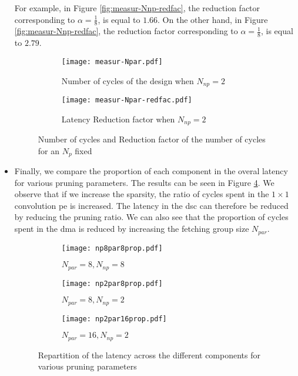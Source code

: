 \begin{itemize}
    For example, in Figure \ref{fig:measur-Nnp-redfac}, the reduction factor corresponding to $\alpha = \frac{1}{8}$, is equal to $1.66$. On the other hand,
    in Figure \ref{fig:measur-Nnp-redfac}, the reduction factor corresponding to $\alpha = \frac{1}{8}$, is equal to $2.79$.
    \begin{figure}[H]
        \centering
        \begin{subfigure}[t]{.49\textwidth}
            \centering
            \texttt{[image: measur-Npar.pdf]}
            \caption{Number of cycles of the design when $N_{np} = 2$}
            \label{fig:measur-Npar}
        \end{subfigure}
        \begin{subfigure}[t]{.49\textwidth}
            \centering
            \texttt{[image: measur-Npar-redfac.pdf]}
            \caption{Latency Reduction factor when $N_{np} = 2$}
            \label{fig:measur-Npar-redfac}
        \end{subfigure}
        \caption{Number of cycles and Reduction factor of the number of cycles for an $N_{p}$ fixed}
    \end{figure}
    \item Finally, we compare the proportion of each component in the overal latency for various pruning parameters. The results can be seen in Figure \ref{fig:ratio-pr}. We observe that if we increase the sparsity, the ratio of cycles spent in the $1 \times 1$ convolution \acrshort{pe} is increased. The latency in the \acrshort{dsc} can therefore be reduced by reducing the pruning ratio. We can also see that the proportion of cycles spent in the \acrshort{dma} is reduced by increasing the fetching group size $N_{par}$.
    \begin{figure}[H]
        \centering
        \begin{subfigure}[t]{.32\textwidth}
            \centering
            \texttt{[image: np8par8prop.pdf]}
            \caption{$N_{par} = 8, N_{np} = 8$}
        \end{subfigure}
        \begin{subfigure}[t]{.32\textwidth}
            \centering
            \texttt{[image: np2par8prop.pdf]}
            \caption{$N_{par} = 8, N_{np} = 2$}
        \end{subfigure}
        \begin{subfigure}[t]{.32\textwidth}
            \centering
            \texttt{[image: np2par16prop.pdf]}
            \caption{$N_{par} = 16, N_{np} = 2$}
        \end{subfigure}
        \caption{Repartition of the latency across the different components for various pruning parameters}
        \label{fig:ratio-pr}
    \end{figure}
\end{itemize}
%
